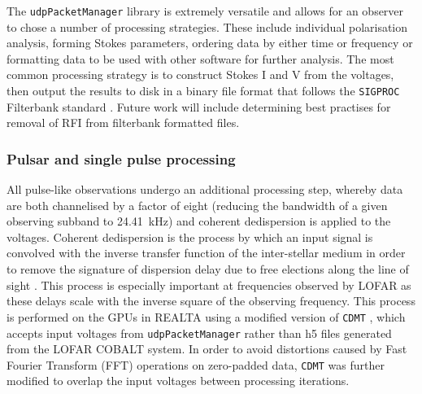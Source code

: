 The \texttt{udpPacketManager} library is extremely versatile and allows for an observer to chose a number of processing strategies. These include individual polarisation analysis, forming Stokes parameters, ordering data by either time or frequency or formatting data to be used with other software for further analysis. The most common processing strategy is to construct Stokes I and V from the voltages, then output the results to disk in a binary file format that follows the \texttt{SIGPROC} Filterbank standard \citep{Lorimer2011}. Future work will include determining best practises for removal of RFI from filterbank formatted files.


\subsubsection{Pulsar and single pulse processing}
\label{sec:pulsarproc}


All pulse-like observations undergo an additional processing step, whereby data are both channelised by a factor of eight (reducing the bandwidth of a given observing subband to 24.41~kHz) and coherent dedispersion is applied to the voltages.
Coherent dedispersion is the process by which an input signal is convolved with the inverse transfer function of the inter-stellar medium in order to remove the signature of dispersion delay due to free elections along the line of sight \citep{Hankins1987}. This process is especially important at frequencies observed by LOFAR as these delays scale with the inverse square of the observing frequency. This process is performed on the GPUs in REALTA using a modified version of \texttt{CDMT} \citep{Bassa2017}, which accepts input voltages from \texttt{udpPacketManager} rather than h5 files generated from the LOFAR COBALT system. In order to avoid distortions caused by Fast Fourier Transform (FFT) operations on zero-padded data, \texttt{CDMT} was further modified to overlap the input voltages between processing iterations.%

